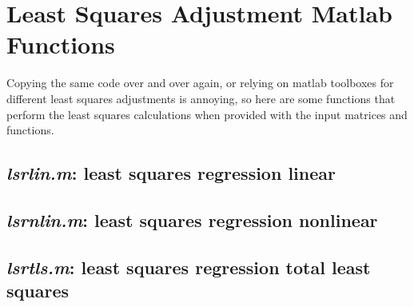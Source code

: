 \section{Least Squares Adjustment Matlab Functions}
Copying the same code over and over again, or relying on matlab toolboxes for different least squares adjustments is annoying, so here are some functions that perform the least squares calculations when provided with the input matrices and functions.

\subsection{\textit{lsrlin.m}: \textnormal{\textbf{l}east \textbf{s}quares \textbf{r}egression \textbf{lin}ear}}


\subsection{\textit{lsrnlin.m}: \textnormal{\textbf{l}east \textbf{s}quares \textbf{r}egression \textbf{n}on\textbf{lin}ear}}



\subsection{\textit{lsrtls.m}: \textnormal{\textbf{l}east \textbf{s}quares \textbf{r}egression \textbf{t}otal \textbf{l}east \textbf{s}quares}}

